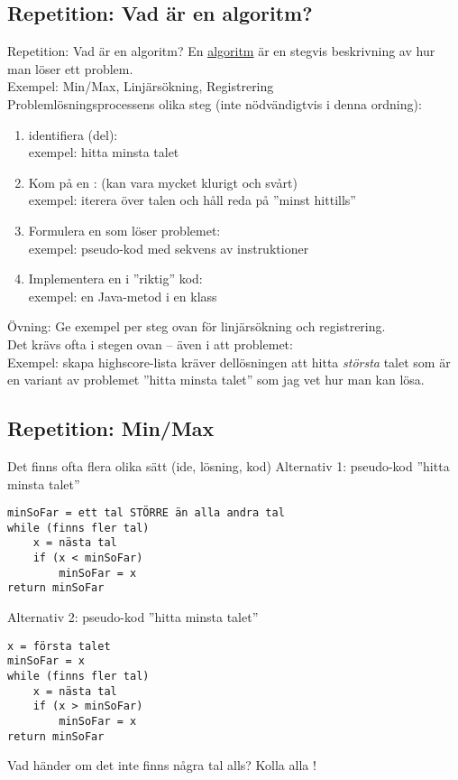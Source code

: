 \documentclass{lecturenotes}
\begin{document}
\subsection{Repetition: Vad är en algoritm?}
\begin{Slide}{Repetition: Vad är en algoritm? }\footnotesize
En \href{https://sv.wikipedia.org/wiki/Algoritm}{algoritm} är en stegvis beskrivning av hur man löser ett problem. \\ 
Exempel: Min/Max, Linjärsökning, Registrering \\
\vspace{1em}
Problemlösningsprocessens olika steg (inte nödvändigtvis i denna ordning): 
\begin{enumerate}
\item identifiera (del): \\ exempel: hitta minsta talet
\item Kom på en : (kan  vara mycket klurigt och svårt) \\ exempel: iterera över talen och håll reda på ''minst hittills''
\item Formulera en  som löser problemet: \\ exempel: pseudo-kod med sekvens av instruktioner
\item Implementera en  i ''riktig'' kod: \\ exempel: en Java-metod i en klass
\end{enumerate}
Övning: Ge exempel per steg ovan för linjärsökning och registrering. \\
Det krävs ofta  i stegen ovan  -- även i att  problemet: \\ Exempel: skapa highscore-lista kräver dellösningen att hitta \emph{största} talet som är en variant av problemet ''hitta minsta talet'' som jag vet hur man kan lösa.
\end{Slide}

\subsection{Repetition: Min/Max}
\begin{Slide}{Det finns ofta flera olika sätt (ide, lösning, kod)}\footnotesize
Alternativ 1: pseudo-kod ''hitta minsta talet''
\begin{lstlisting}
minSoFar = ett tal STÖRRE än alla andra tal
while (finns fler tal) 
    x = nästa tal
    if (x < minSoFar) 
        minSoFar = x
return minSoFar
\end{lstlisting}
Alternativ 2: pseudo-kod ''hitta minsta talet''
\begin{lstlisting}
x = första talet
minSoFar = x
while (finns fler tal) 
    x = nästa tal
    if (x > minSoFar) 
        minSoFar = x
return minSoFar
\end{lstlisting}
Vad händer om det inte finns några tal alls? Kolla alla !
\end{Slide}
\end{document}
